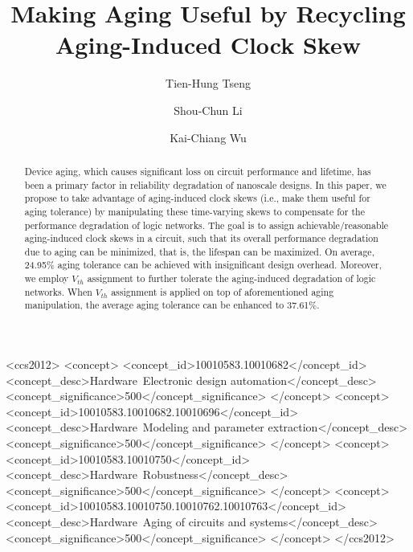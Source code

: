 \documentclass[format=acmsmall, review=false, screen=true]{acmart}
\begin{document}
\title[Making Aging Useful by Recycling Aging-Induced Clock Skew]{\fontsize{14}{10}\selectfont Making Aging Useful by Recycling Aging-Induced Clock Skew}


\author{Tien-Hung Tseng}


\author{Shou-Chun Li}


\author{Kai-Chiang Wu}



\begin{abstract}
Device aging, which causes significant loss on circuit performance and lifetime, has been a primary factor in reliability degradation of nanoscale designs. In this paper, we propose to take advantage of aging-induced clock skews (i.e., make them useful for aging tolerance) by manipulating these time-varying skews to compensate for the performance degradation of logic networks. The goal is to assign achievable/reasonable aging-induced clock skews in a circuit, such that its overall performance degradation due to aging can be minimized, that is, the lifespan can be maximized.  On average, 24.95\% aging tolerance can be achieved with insignificant design overhead. Moreover, we employ $V_{th}$ assignment to further tolerate the aging-induced degradation of logic networks. When $V_{th}$ assignment is applied on top of aforementioned aging manipulation, the average aging tolerance can be enhanced to 37.61\%.
\end{abstract}


\begin{CCSXML}
<ccs2012>
<concept>
<concept_id>10010583.10010682</concept_id>
<concept_desc>Hardware~Electronic design automation</concept_desc>
<concept_significance>500</concept_significance>
</concept>
<concept>
<concept_id>10010583.10010682.10010696</concept_id>
<concept_desc>Hardware~Modeling and parameter extraction</concept_desc>
<concept_significance>500</concept_significance>
</concept>
<concept>
<concept_id>10010583.10010750</concept_id>
<concept_desc>Hardware~Robustness</concept_desc>
<concept_significance>500</concept_significance>
</concept>
<concept>
<concept_id>10010583.10010750.10010762.10010763</concept_id>
<concept_desc>Hardware~Aging of circuits and systems</concept_desc>
<concept_significance>500</concept_significance>
</concept>
</ccs2012>
\end{CCSXML}
\end{document}
